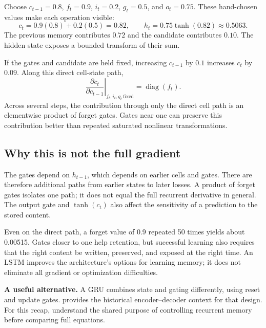 
Choose $c_{t-1}=0.8$, $f_t=0.9$, $i_t=0.2$, $g_t=0.5$, and $o_t=0.75$.
These hand-chosen values make each operation visible:
\[
 c_t=0.9(0.8)+0.2(0.5)=0.82,\qquad
 h_t=0.75\tanh(0.82)\approx0.5063.
\]
The previous memory contributes $0.72$ and the candidate contributes $0.10$.
The hidden state exposes a bounded transform of their sum.


If the gates and candidate are held fixed, increasing $c_{t-1}$ by $0.1$
increases $c_t$ by $0.09$. Along this direct cell-state path,
\[
 \left.\frac{\partial c_t}{\partial c_{t-1}}\right|_{f_t,i_t,g_t\ \mathrm{fixed}}
 =\operatorname{diag}(f_t).
\]
Across several steps, the contribution through only the direct cell path
is an elementwise product of forget gates. Gates near one can preserve
this contribution better than repeated saturated nonlinear transformations.

\subsection*{Why this is not the full gradient}
The gates depend on $h_{t-1}$, which depends on earlier cells and gates.
There are therefore additional paths from earlier states to later losses.
A product of forget gates isolates one path; it does not equal the full
recurrent derivative in general. The output gate and $\tanh(c_t)$ also
affect the sensitivity of a prediction to the stored content.

Even on the direct path, a forget value of 0.9 repeated 50 times yields
about 0.00515. Gates closer to one help retention, but successful learning
also requires that the right content be written, preserved, and exposed
at the right time. An LSTM improves the architecture's options for learning
memory; it does not eliminate all gradient or optimization difficulties.

\textbf{A useful alternative.} A GRU combines state and gating differently,
using reset and update gates.  provides the historical
encoder--decoder context for that design. For this recap, understand the
shared purpose of controlling recurrent memory before comparing full equations.

